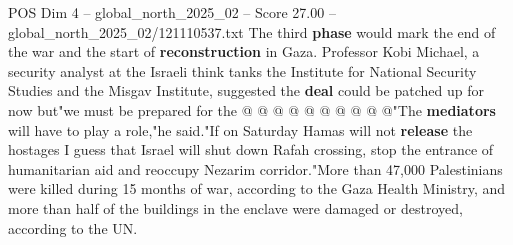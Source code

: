 \begin{textsample}{POS Dim 4 – global\_north\_2025\_02 – Score 27.00 – global\_north\_2025\_02/121110537.txt}
The third \textbf{phase} would mark the end of the war and the start of \textbf{reconstruction} in Gaza.
Professor Kobi Michael, a security analyst at the Israeli think tanks the Institute for National Security Studies and the Misgav Institute, suggested the \textbf{deal} could be patched up for now but"we must be prepared for the @ @ @ @ @ @ @ @ @ @"The \textbf{mediators} will have to play a role,"he said."If on Saturday Hamas will not \textbf{release} the hostages I guess that Israel will shut down Rafah crossing, stop the entrance of humanitarian aid and reoccupy Nezarim corridor."More than 47,000 Palestinians were killed during 15 months of war, according to the Gaza Health Ministry, and more than half of the buildings in the enclave were damaged or destroyed, according to the UN.

\end{textsample}
